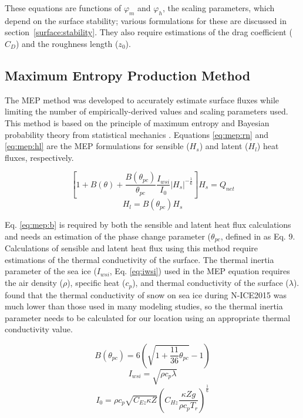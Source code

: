 These equations are functions of $\varphi_{m}$ and $\varphi_{h}$, the scaling parameters, which depend on the surface stability; various formulations for these are discussed in section~\ref{surface:stability}. They also require estimations of the drag coefficient ($C_{D}$) and the roughness length ($z_{0}$).

\subsection{Maximum Entropy Production Method} 
The MEP method was developed to accurately estimate surface fluxes while limiting the number of empirically-derived values and scaling parameters used. This method is based on the principle of maximum entropy and Bayesian probability theory from statistical mechanics \citep{wang:2014}. Equations \ref{eq:mep:rn} and \ref{eq:mep:hl}  are the MEP formulations for sensible ($H_{s}$) and latent ($H_{l}$) heat fluxes, respectively. 

\begin{equation}\label{eq:mep:rn}
\left[ 1 + B(\theta) + \frac{B(\theta_{pc})}{\theta_{pc}} \frac{I_{wsi}}{I_{0}} | H_{s} | ^{-\frac{1}{6}} \right] H_{s} = Q_{net}
\end{equation}
\begin{equation}\label{eq:mep:hl}
H_{l} = B(\theta_{pc}) H_{s}
\end{equation}

Eq. \ref{eq:mep:b} is required by both the sensible and latent heat flux calculations and needs an estimation of the phase change parameter ($\theta_{pc}$, defined in \citep{wang:2011} as Eq. 9. Calculations of sensible and latent heat flux using this method require estimations of the thermal conductivity \citep{wang:2014} of the surface. The thermal inertia parameter of the sea ice ($I_{wsi}$, Eq. \ref{eq:iwsi}) used in the MEP equation requires the air density ($\rho$), specific heat ($c_{p}$), and thermal conductivity of the surface ($\lambda$). \citet{merkouriadi:2017} found that the thermal conductivity of snow on sea ice during N-ICE2015 was much lower than those used in many modeling studies, so the thermal inertia parameter needs to be calculated for our location using an appropriate thermal conductivity value. 

\begin{equation}\label{eq:mep:b}
B(\theta_{pc}) = 6 \left( \sqrt{1 + \frac{11}{36} \theta_{pc}} - 1 \right)
\end{equation}
\begin{equation}\label{eq:iwsi}
I_{wsi} = \sqrt{\rho c_{p} \lambda}
\end{equation}
\begin{equation}\label{eq:i0}
I_{0} = \rho c_{p} \sqrt{C_{Ez}\kappa Z} \left( C_{Hz} \frac{\kappa Zg}{\rho c_{p} T_{r}} \right)^{\frac{1}{6}}
\end{equation}

